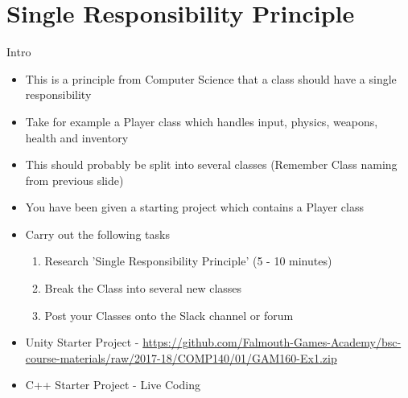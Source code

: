 \part{Single Responsibility Principle}
\frame{\partpage}

\begin{frame}{Intro}
	\begin{itemize}
		\pause \item This is a principle from Computer Science that a class should have a single responsibility
		\pause \item Take for example a Player class which handles input, physics, weapons, health and inventory
		\pause \item This should probably be split into several classes (Remember Class naming from previous slide)
	\end{itemize}
\end{frame}

\begin{frame}
	\begin{itemize}
		\pause \item You have been given a starting project which contains a Player class
		\pause \item Carry out the following tasks
		\begin{enumerate}
			\pause \item Research 'Single Responsibility Principle' (5 - 10 minutes)
			\pause \item Break the Class into several new classes
			\pause \item Post your Classes onto the Slack channel or forum  
		\end{enumerate} 
		\pause \item Unity Starter Project - \url{https://github.com/Falmouth-Games-Academy/bsc-course-materials/raw/2017-18/COMP140/01/GAM160-Ex1.zip}
		\pause \item C++ Starter Project - Live Coding
	\end{itemize}
\end{frame}